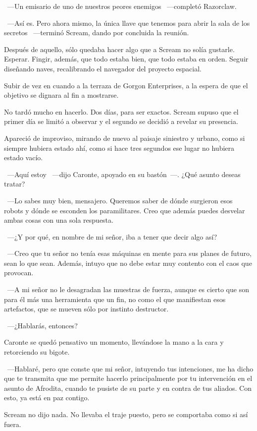 ~---Un emisario de uno de nuestros peores enemigos ~---completó Razorclaw.

~---Así es. Pero ahora mismo, la única llave que tenemos para abrir la sala de los secretos ~---terminó Scream, dando por concluida la reunión.

\parbreak
Después de aquello, sólo quedaba hacer algo que a Scream no solía gustarle. Esperar. Fingir, además, que todo estaba bien, que todo estaba en orden. Seguir diseñando naves, recalibrando el navegador del proyecto espacial.

Subir de vez en cuando a la terraza de Gorgon Enterprises, a la espera de que el objetivo se dignara al fin a mostrarse.

No tardó mucho en hacerlo. Dos días, para ser exactos. Scream supuso que el primer día se limitó a observar y el segundo se decidió a revelar su presencia.

Apareció de improviso, mirando de nuevo al paisaje siniestro y urbano, como si siempre hubiera estado ahí, como si hace tres segundos ese lugar no hubiera estado vacío.

~---Aquí estoy ~---dijo Caronte, apoyado en su bastón~---. ¿Qué asunto deseas tratar?

~---Lo sabes muy bien, mensajero. Queremos saber de dónde surgieron esos robots y dónde se esconden los paramilitares. Creo que además puedes desvelar ambas cosas con una sola respuesta.

~---¿Y por qué, en nombre de mi señor, iba a tener que decir algo así?

~---Creo que tu señor no tenía esas máquinas en mente para sus planes de futuro, sean lo que sean. Además, intuyo que no debe estar muy contento con el caos que provocan.

~---A mi señor no le desagradan las muestras de fuerza, aunque es cierto que son para él más una herramienta que un fin, no como el que manifiestan esos artefactos, que se mueven sólo por instinto destructor.

~---¿Hablarás, entonces?

Caronte se quedó pensativo un momento, llevándose la mano a la cara y retorciendo su bigote.

~---Hablaré, pero que conste que mi señor, intuyendo tus intenciones, me ha dicho que te transmita que me permite hacerlo principalmente por tu intervención en el asunto de Afrodita, cuando te pusiste de su parte y en contra de tus aliados. Con esto, ya está en paz contigo.

Scream no dijo nada. No llevaba el traje puesto, pero se comportaba como si así fuera.

